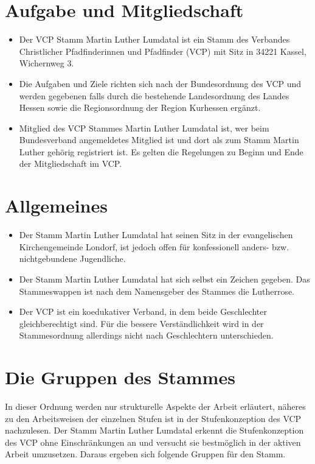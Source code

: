\documentclass[a4paper]{article}
\begin{document}
\clearpage
\tableofcontents 
\clearpage

\section{Aufgabe und Mitgliedschaft} %
\label{sec:aufgabe_und_mitgliedschaft}
	\begin{itemize}
		\item Der VCP Stamm Martin Luther Lumdatal ist ein Stamm des Verbandes Christlicher Pfadfinderinnen und Pfadfinder (VCP) mit Sitz in 34221 Kassel, Wichernweg 3. 
		\item Die Aufgaben und Ziele richten sich nach der Bundesordnung des VCP und werden gegebenen falls durch die bestehende Landesordnung des Landes Hessen sowie die Regionsordnung der Region Kurhessen ergänzt. 
		\item Mitglied des VCP Stammes Martin Luther Lumdatal ist, wer beim Bundesverband angemeldetes Mitglied ist und dort als zum Stamm Martin Luther gehörig registriert ist. Es gelten die Regelungen zu Beginn und Ende der Mitgliedschaft im VCP. 
	\end{itemize}

\section{Allgemeines} %
\label{sec:allgemeines}
	\begin{itemize}
		\item Der Stamm Martin Luther Lumdatal hat seinen Sitz in der evangelischen Kirchengemeinde Londorf, ist jedoch offen für konfessionell anders- bzw. nichtgebundene Jugendliche. 
		\item Der Stamm Martin Luther Lumdatal hat sich selbst ein Zeichen gegeben. Das Stammeswappen ist nach dem Namensgeber des Stammes die Lutherrose. 
		\item Der VCP ist ein koedukativer Verband, in dem beide Geschlechter gleichberechtigt sind. Für die bessere Verständlichkeit wird in der Stammesordnung allerdings nicht nach Geschlechtern unterschieden.
	\end{itemize}

\section{Die Gruppen des Stammes} %
\label{sec:die_gruppen_des_stammes}
In dieser Ordnung werden nur strukturelle Aspekte der Arbeit erläutert, näheres zu den Arbeitsweisen der einzelnen Stufen ist in der Stufenkonzeption des VCP nachzulesen. Der Stamm Martin Luther Lumdatal erkennt die Stufenkonzeption des VCP ohne Einschränkungen an und versucht sie bestmöglich in der aktiven Arbeit umzusetzen. Daraus ergeben sich folgende Gruppen für den Stamm.
\end{document}
